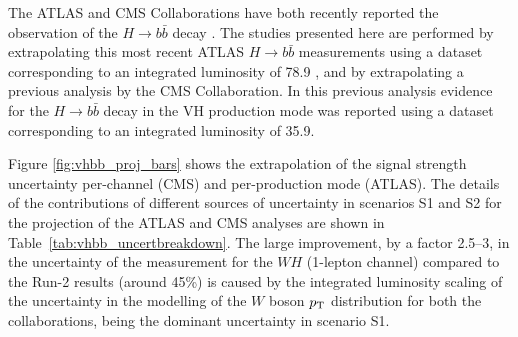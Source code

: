 The ATLAS and CMS Collaborations have both recently reported the observation of the $H \to b\bar{b}$ decay \cite{Aaboud:2018zhk,Sirunyan:2018kst}.
The studies presented here are performed by extrapolating this most recent ATLAS $H \to b\bar{b}$ measurements using a dataset corresponding to an integrated luminosity of 78.9 \fbinv, and by extrapolating a previous analysis by the CMS Collaboration. In this previous analysis evidence for the $H \to b\bar{b}$ decay in the $\text{VH}$ production mode was reported using a dataset corresponding to an integrated luminosity of 35.9\fbinv \cite{HIG16044}. 



Figure \ref{fig:vhbb_proj_bars} shows the extrapolation of the signal strength uncertainty per-channel (CMS) and per-production mode (ATLAS). The details of the contributions of different sources of uncertainty in scenarios S1 and S2 for the projection of the ATLAS and CMS analyses are shown in Table~\ref{tab:vhbb_uncertbreakdown}.
The large improvement, by a factor 2.5--3, in the uncertainty of the measurement for the $WH$ (1-lepton channel) compared to the Run-2 results (around 45\%) is caused by the integrated luminosity scaling of the uncertainty in the modelling of the $W$ boson $p\sb{\scriptstyle\mathrm{T}}$ distribution for both the collaborations, being the dominant uncertainty in scenario S1.

